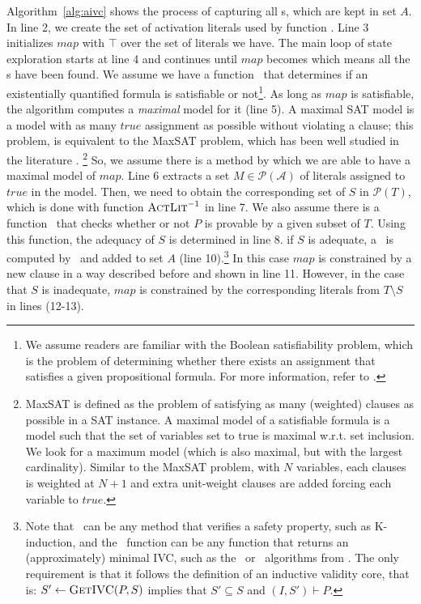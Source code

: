 Algorithm~\ref{alg:aivc} shows the process of capturing all \mivc s,
which are kept in set $A$. In line 2, we create the set of activation
literals used by function \actlit . Line 3 initializes $map$ with
$\top$ over the set of literals we have. The main loop of state
exploration starts at line 4 and continues until $map$ becomes \unsat
which means all the \mivc s have been found. We assume we have a
function \checksat ~that determines if an existentially quantified
formula is satisfiable or not\footnote{We assume readers are familiar
  with the Boolean satisfiability problem, which is the problem of
  determining whether there exists an assignment that satisfies a
  given propositional formula. For more information, refer to
  \cite{cook1971complexity}.}.
As long as $map$ is satisfiable, the algorithm computes a
\emph{maximal} \sat model for it (line 5). A maximal SAT model is a
model with as many $true$ assignment as possible without violating a
clause; this problem, is equivalent
to the MaxSAT problem, which has been well studied in the
literature \cite{davies2011solving,
  morgado2013iterative}. \footnote{MaxSAT is defined as the problem of satisfying as many
(weighted) clauses as possible in a SAT instance. A maximal model of a satisfiable formula is a model such that the set of variables set to true is maximal w.r.t. set inclusion. We look for a maximum model (which is also maximal, but with the largest cardinality). Similar to the MaxSAT problem, with $N$
variables, each clauses is weighted at $N+1$ and extra unit-weight clauses are
added forcing each variable to $true$.} So, we assume there is a method by which we
are able to have a maximal model of $map$. Line 6 extracts a set $M
\in \mathcal{P} (\mathcal{A})$ of literals assigned to $true$ in the
model. Then, we need to obtain the corresponding set of $S$ in
$\mathcal{P}(T)$, which is done with function $\textsc{ActLit} ^{-1}$ in line
7. We also assume there is a function \isadeq ~that checks whether or
not $P$ is provable by a given subset of $T$. Using this function, the
adequacy of $S$ is determined in line 8. if $S$ is adequate, a \mivc
~is computed by \getivc ~and added to set $A$ (line 10).\footnote{Note
  that \isadeq ~can be any method that verifies a safety property,
  such as K-induction, and the \getivc\ function can be any function
  that returns an (approximately) minimal IVC, such as the \ucalg\ or
  \ucbfalg\ algorithms from \cite{Ghass16}. The only requirement is
  that it follows the definition of an inductive validity core, that
  is: $S' \leftarrow \textsc{GetIVC} (P, S)$ implies that $S' \subseteq S$ and
  $(I, S') \vdash P$.} In this case $map$ is constrained by a new
clause in a way described before and shown in line 11. However, in the
case that $S$ is inadequate, $map$ is constrained by the corresponding
literals from $T \setminus S$ in lines (12-13).

